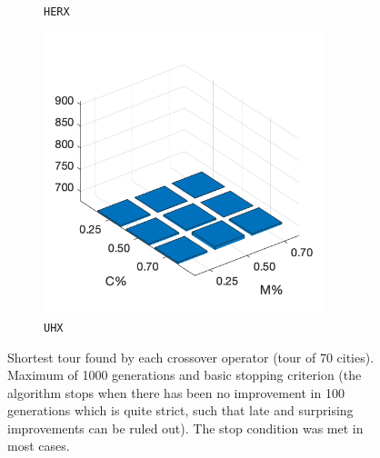 \begin{figure}
\begin{subfigure}[b]{0.25\textwidth}
		\caption{\texttt{HERX}}
		\label{fig:y}
    	\end{subfigure}
%
	\begin{subfigure}[b]{0.25\textwidth}
		\centering
		\includegraphics[width=0.9\textwidth]{crossover/cross_unnamed_1.png}
		\caption{\texttt{UHX}}
		\label{fig:z}
    	\end{subfigure}
	\caption{Shortest tour found by each crossover operator (tour of 70 cities). Maximum of 1000 generations and basic stopping criterion (the algorithm stops when there has been no improvement in 100 generations which is quite strict, such that late and surprising improvements can be ruled out). The stop condition was met in most cases.}
	\label{fig:rescross}
\end{figure}

